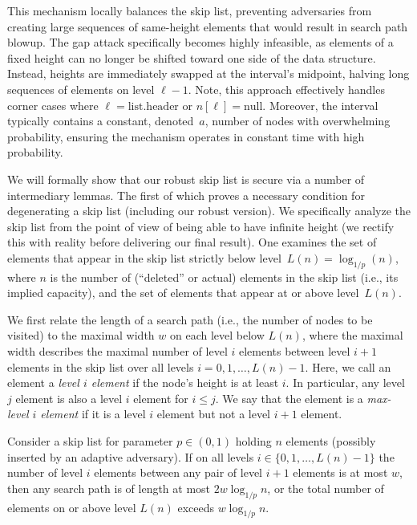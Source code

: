 This mechanism locally balances the skip list, preventing adversaries from creating large sequences of same-height elements that would result in search path blowup. The gap attack specifically becomes highly infeasible, as elements of a fixed height can no longer be shifted toward one side of the data structure. Instead, heights are immediately swapped at the interval's midpoint, halving long sequences of elements on level $\ell-1$. Note, this approach effectively handles corner cases where $\ell = \text{list.header}$ or $n[\ell] = \text{null}$. Moreover, the interval typically contains a constant, denoted~$a$, number of nodes with overwhelming probability, ensuring the mechanism operates in constant time with high probability.

We will formally show that our robust skip list is secure via a number of intermediary lemmas. The first of which proves a necessary condition for degenerating a skip list (including our robust version). We specifically analyze the skip list from the point of view of being able to have infinite height (we rectify this with reality before delivering our final result). One examines the set of elements that appear in the skip list strictly below level~$L(n) = \log_{1/p}(n)$, where $n$ is the number of (``deleted'' or actual) elements in the skip list (i.e., its implied capacity), and the set of elements that appear at or above level~$L(n)$.

We first relate the length of a search path (i.e., the number of nodes to be visited) to the maximal width $w$ on each level below $L(n)$, where the maximal width describes the maximal number of level $i$ elements between level $i+1$ elements in the skip list over all levels $i=0,1,\dots, L(n)-1$.  Here, we call an element a \emph{level $i$ element} if the node's height is at least $i$. In particular, any level $j$ element is also a level $i$ element for $i\le j$. We say that the element is a \emph{max-level $i$ element} if it is a level $i$ element but not a level $i+1$ element.

\begin{lemma}\label{lemma:ncdsl}
Consider a skip list for parameter $p\in(0,1)$ holding $n$ elements (possibly inserted by an adaptive adversary). If on all levels $i\in\{0,1,\dots, L(n)-1\}$ the number of level $i$ elements between any pair of level $i+1$ elements is at most $w$, then any search path is of length at most $2w\log_{1/p}n$, or the total number of elements on or above level $L(n)$ exceeds $w\log_{1/p}n$.
\end{lemma}

